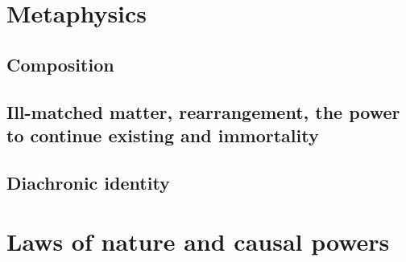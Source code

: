 \chapter{Metaphysics}\label{ch:metaphysics}
\section{Composition}
\section{Ill-matched matter, rearrangement, the power to continue existing and immortality}
\section{Diachronic identity}
\chaptertail 

\def\mychapter{IX}

\chapter{Laws of nature and causal powers}\label{ch:laws}
\chaptertail

